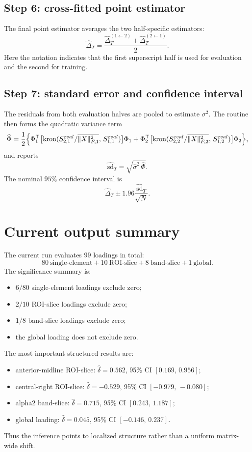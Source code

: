 \documentclass[11pt]{article}
\begin{document}
\subsection*{Step 6: cross-fitted point estimator}
The final point estimator averages the two half-specific estimators:
\[
\widehat\Delta_T
=
\frac{\widehat\Delta_T^{(1\leftarrow 2)}+\widehat\Delta_T^{(2\leftarrow 1)}}{2}.
\]
Here the notation indicates that the first superscript half is used for evaluation and the second for training.

\subsection*{Step 7: standard error and confidence interval}
The residuals from both evaluation halves are pooled to estimate \(\sigma^2\). The routine then forms the quadratic variance term
\[
\widehat\Phi
=
\frac{1}{2}\Bigl\{
\Phi_1^\top \bigl[\mathrm{kron}(S_{2,1}^{eval}/\overline{\|X\|_{F,1}^2},\,S_{1,1}^{eval})\bigr]\Phi_1
+
\Phi_2^\top \bigl[\mathrm{kron}(S_{2,2}^{eval}/\overline{\|X\|_{F,2}^2},\,S_{1,2}^{eval})\bigr]\Phi_2
\Bigr\},
\]
and reports
\[
\widehat{\mathrm{sd}}_T=\sqrt{\widehat{\sigma}^2\,\widehat\Phi}.
\]
The nominal \(95\%\) confidence interval is
\[
\widehat\Delta_T \pm 1.96\frac{\widehat{\mathrm{sd}}_T}{\sqrt{N}}.
\]

\section{Current output summary}
The current run evaluates \(99\) loadings in total:
\[
80\ \text{single-element} + 10\ \text{ROI-slice} + 8\ \text{band-slice} + 1\ \text{global}.
\]
The significance summary is:
\begin{itemize}[leftmargin=2em]
    \item \(6/80\) single-element loadings exclude zero;
    \item \(2/10\) ROI-slice loadings exclude zero;
    \item \(1/8\) band-slice loadings exclude zero;
    \item the global loading does not exclude zero.
\end{itemize}

The most important structured results are:
\begin{itemize}[leftmargin=2em]
    \item anterior-midline ROI-slice: \(\hat\delta=0.562\), 95\% CI \([0.169,\,0.956]\);
    \item central-right ROI-slice: \(\hat\delta=-0.529\), 95\% CI \([-0.979,\,-0.080]\);
    \item alpha2 band-slice: \(\hat\delta=0.715\), 95\% CI \([0.243,\,1.187]\);
    \item global loading: \(\hat\delta=0.045\), 95\% CI \([-0.146,\,0.237]\).
\end{itemize}
Thus the inference points to localized structure rather than a uniform matrix-wide shift.
\end{document}
